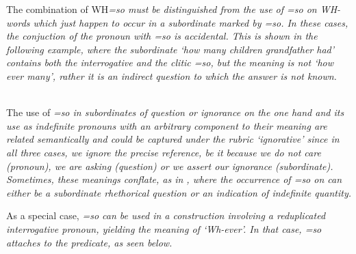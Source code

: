 The combination of WH\em=so \em must be distinguished from the use of \em =so \em on WH-words which just happen to occur in a subordinate marked by \em =so\em. In these cases,  the conjuction of the pronoun with \em =so \em is accidental. This is shown in the following example, where the subordinate `how many children grandfather had' contains both the interrogative  and the clitic \em =so\em, but the meaning is not `how ever many', rather it is an indirect question to which the answer is not known.

\\

The use of \em =so \em in subordinates of question or ignorance on the one hand and its use as indefinite pronouns with an arbitrary component to their meaning are related semantically and could be captured under the rubric `ignorative' since in all three cases, we ignore the precise reference, be it because we do not care (pronoun), we are asking (question) or we assert our ignorance (subordinate). Sometimes, these meanings conflate, as in , where the  occurrence of \em =so \em on  can either be a subordinate rhethorical question or an indication of indefinite quantity.






As a special case, \em =so \em can be used in a construction involving a reduplicated interrogative pronoun, yielding the meaning of `Wh-ever'. In that case, \em =so \em attaches to the predicate, as seen below.



